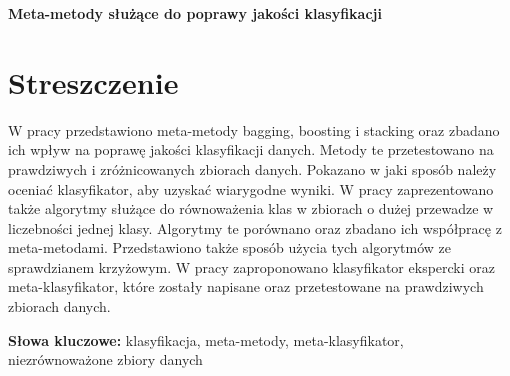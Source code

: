\newpage
\begin{center}
\large \bf
Meta-metody służące do poprawy jakości klasyfikacji
\end{center}

\section*{Streszczenie}
W pracy przedstawiono meta-metody bagging, boosting i stacking oraz zbadano ich wpływ na poprawę jakości klasyfikacji danych. Metody te przetestowano na prawdziwych i zróżnicowanych zbiorach danych. 
Pokazano w jaki sposób należy oceniać klasyfikator, aby uzyskać wiarygodne wyniki. W pracy zaprezentowano także algorytmy służące do równoważenia klas w zbiorach o dużej przewadze w liczebności jednej klasy.
Algorytmy te porównano oraz zbadano ich współpracę z meta-metodami. Przedstawiono także sposób użycia tych algorytmów ze sprawdzianem krzyżowym. W pracy zaproponowano klasyfikator ekspercki oraz meta-klasyfikator, które zostały napisane oraz przetestowane na prawdziwych zbiorach danych.

\bigskip
{\noindent\bf Słowa kluczowe:} klasyfikacja, meta-metody, meta-klasyfikator, niezrównoważone zbiory danych


